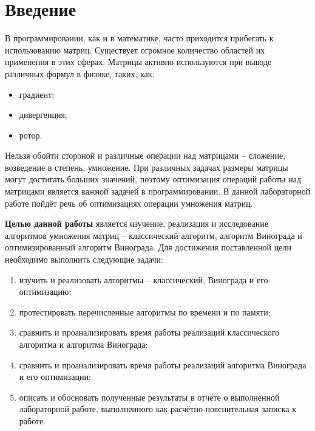 \chapter*{Введение}

В программировании, как и в математике, часто приходится прибегать к использованию матриц. 
Существует огромное количество областей их применения в этих сферах. 
Матрицы активно используются при выводе различных формул в физике, таких, как:
\begin{itemize}
    \item градиент;
    \item дивергенция;
    \item ротор.
\end{itemize}

Нельзя обойти стороной и различные операции над матрицами -- сложение, возведение в степень, умножение. 
При различных задачах размеры матрицы могут достигать больших значений, поэтому оптимизация операций работы над матрицами является важной задачей в программировании. 
В данной лабораторной работе пойдёт речь об оптимизациях операции умножения матриц.


\textbf{Целью данной работы} является изучение, реализация и исследование алгоритмов умножения матриц -- классический алгоритм, алгоритм Винограда и оптимизированный алгоритм Винограда. 
Для достижения поставленной цели необходимо выполнить следующие задачи:
\begin{enumerate}[label=\arabic*)]
	\item изучить и реализовать алгоритмы -- классический, Винограда и его оптимизацию;
    \item протестировать перечисленные алгоритмы по времени и по памяти;
    \item сравнить и проанализировать время работы реализаций классического алгоритма и алгоритма Винограда;
    \item сравнить и проанализировать время работы реализаций алгоритма Винограда и его оптимизации;
	\item описать и обосновать полученные результаты в отчёте о выполненной лабораторной работе, выполненного как расчётно-пояснительная записка к работе.
\end{enumerate}
